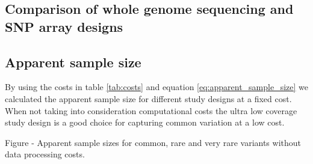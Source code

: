 



\subsection{Comparison of whole genome sequencing and SNP array designs}





\subsection{Apparent sample size}
By using the costs in table \ref{tab:costs} and equation \ref{eq:apparent_sample_size} we calculated the apparent sample size for different study designs at a fixed cost. When not taking into consideration computational costs the ultra low coverage study design is a good choice for capturing common variation at a low cost.

Figure - Apparent sample sizes for common, rare and very rare variants without data processing costs. 


